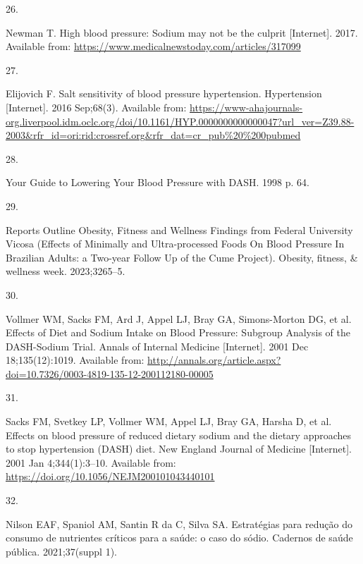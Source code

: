 \documentclass[
]{article}
\newlength{\cslhangindent}
\newlength{\csllabelwidth}
\newlength{\cslentryspacingunit} %
\newenvironment{CSLReferences}[2] %
 {%
  \setlength{\parindent}{0pt}
  \ifodd #1
  \let\oldpar\par
  \def\par{\hangindent=\cslhangindent\oldpar}
  \fi
  \setlength{\parskip}{#2\cslentryspacingunit}
 }%
 {}
\newcommand{\CSLLeftMargin}[1]{\parbox[t]{\csllabelwidth}{#1}}
\newcommand{\CSLRightInline}[1]{\parbox[t]{\linewidth - \csllabelwidth}{#1}\break}
\begin{document}
\begin{CSLReferences}{0}{0}
\leavevmode{}%
\CSLLeftMargin{26. }%
\CSLRightInline{Newman T. High blood pressure: Sodium may not be the
culprit {[}Internet{]}. 2017. Available from:
\url{https://www.medicalnewstoday.com/articles/317099}}

\leavevmode{}%
\CSLLeftMargin{27. }%
\CSLRightInline{Elijovich F. Salt sensitivity of blood pressure
\textbar{} hypertension. Hypertension {[}Internet{]}. 2016 Sep;68(3).
Available from:
\url{https://www-ahajournals-org.liverpool.idm.oclc.org/doi/10.1161/HYP.0000000000000047?url_ver=Z39.88-2003\&rfr_id=ori:rid:crossref.org\&rfr_dat=cr_pub\%20\%200pubmed}}

\leavevmode{}%
\CSLLeftMargin{28. }%
\CSLRightInline{Your Guide to Lowering Your Blood Pressure with DASH.
1998 p. 64. }

\leavevmode{}%
\CSLLeftMargin{29. }%
\CSLRightInline{Reports Outline Obesity, Fitness and Wellness Findings
from Federal University Vicosa (Effects of Minimally and Ultra-processed
Foods On Blood Pressure In Brazilian Adults: a Two-year Follow Up of the
Cume Project). Obesity, fitness, \& wellness week. 2023;3265--5. }

\leavevmode{}%
\CSLLeftMargin{30. }%
\CSLRightInline{Vollmer WM, Sacks FM, Ard J, Appel LJ, Bray GA,
Simons-Morton DG, et al. Effects of Diet and Sodium Intake on Blood
Pressure: Subgroup Analysis of the DASH-Sodium Trial. Annals of Internal
Medicine {[}Internet{]}. 2001 Dec 18;135(12):1019. Available from:
\url{http://annals.org/article.aspx?doi=10.7326/0003-4819-135-12-200112180-00005}}

\leavevmode{}%
\CSLLeftMargin{31. }%
\CSLRightInline{Sacks FM, Svetkey LP, Vollmer WM, Appel LJ, Bray GA,
Harsha D, et al. Effects on blood pressure of reduced dietary sodium and
the dietary approaches to stop hypertension (DASH) diet. New England
Journal of Medicine {[}Internet{]}. 2001 Jan 4;344(1):3--10. Available
from: \url{https://doi.org/10.1056/NEJM200101043440101}}

\leavevmode{}%
\CSLLeftMargin{32. }%
\CSLRightInline{Nilson EAF, Spaniol AM, Santin R da C, Silva SA.
Estratégias para redução do consumo de nutrientes críticos para a saúde:
o caso do sódio. Cadernos de saúde pública. 2021;37(suppl 1). }


\end{CSLReferences}
\end{document}
